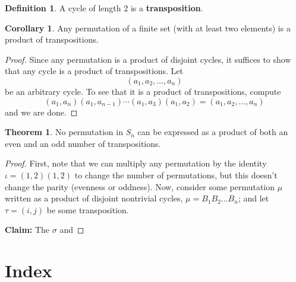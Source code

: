 \documentclass[a5paper]{article}
\theoremstyle{definition}%
\newtheorem*{theorem*}{Theorem} %
\newtheorem*{corollary*}{Corollary}
\newtheorem*{definition*}{Definition}
\numberwithin{exercise}{section}
\theoremstyle{remark}%
\begin{document}
\begin{highlight}
\begin{definition*}
A cycle of length 2 is a \textbf{transposition}.
\end{definition*}
\end{highlight}
\begin{highlight}
\begin{corollary*}
Any permutation of a finite set (with at least two elements) is a product of transpositions. 
\end{corollary*}
\end{highlight}
\begin{proof}
Since any permutation is a product of disjoint cycles, it suffices to show that any cycle is a product of transpositions. Let 
$$(a_1, a_2, \dots, a_n)$$
be an arbitrary cycle. To see that it is a product of transpositions, compute 
$$(a_1,a_n)(a_1,a_{n-1})\cdots(a_1,a_3)(a_1,a_2)=(a_1, a_2, \dots, a_n)$$
and we are done. 
\end{proof}

\begin{highlight}
\begin{theorem*}
No permutation in $S_n$ can be expressed as a product of both an even and an odd number of transpositions. 
\end{theorem*}
\end{highlight}
\begin{proof}
First, note that we can multiply any permutation by the identity $\iota =(1,2)(1,2)$ to change the number of permutations, but this doesn't change the parity (evenness or oddness). Now, consider some permutation $\mu$ written as a product of disjoint nontrivial cycles, $\mu=B_1B_2\dots B_n$; and let $\tau = (i,j)$ be some transposition. 

\textbf{Claim:} The $\sigma$ and 
\end{proof}

\pagebreak
\section{Index}
\printindex
\end{document}
